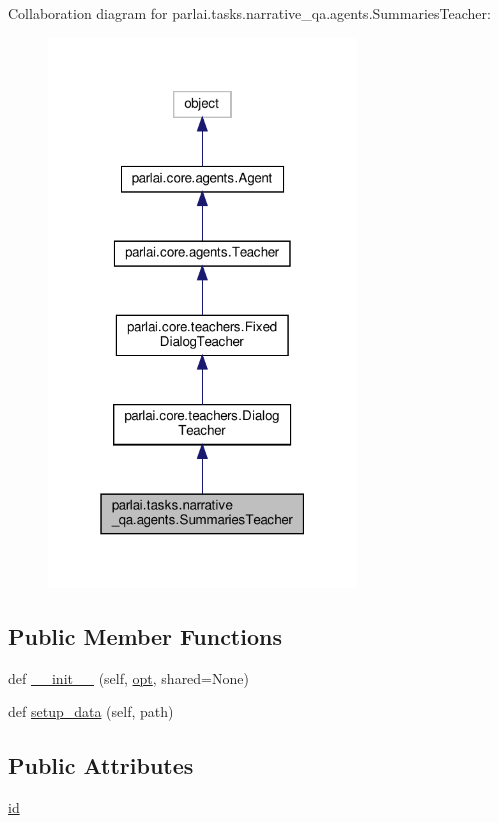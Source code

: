 Collaboration diagram for parlai.\+tasks.\+narrative\+\_\+qa.\+agents.\+Summaries\+Teacher\+:
\nopagebreak
\begin{figure}[H]
\begin{center}
\leavevmode
\includegraphics[width=232pt]{classparlai_1_1tasks_1_1narrative__qa_1_1agents_1_1SummariesTeacher__coll__graph}
\end{center}
\end{figure}
\subsection*{Public Member Functions}
\begin{DoxyCompactItemize}
\item 
def \hyperlink{classparlai_1_1tasks_1_1narrative__qa_1_1agents_1_1SummariesTeacher_a833c2c54f6084e88dbe0a16151fc4a46}{\+\_\+\+\_\+init\+\_\+\+\_\+} (self, \hyperlink{classparlai_1_1core_1_1agents_1_1Teacher_a3ce6243860ce978a897922863ed32fa4}{opt}, shared=None)
\item 
def \hyperlink{classparlai_1_1tasks_1_1narrative__qa_1_1agents_1_1SummariesTeacher_a76f9cadca71b61d42c5997ba590f107e}{setup\+\_\+data} (self, path)
\end{DoxyCompactItemize}
\subsection*{Public Attributes}
\begin{DoxyCompactItemize}
\item 
\hyperlink{classparlai_1_1tasks_1_1narrative__qa_1_1agents_1_1SummariesTeacher_a00d240ba5d5d8c7ba0257dbbbc2ba58c}{id}
\end{DoxyCompactItemize}
